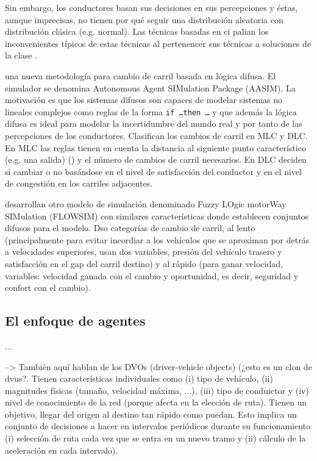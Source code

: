 Sin embargo, los conductores basan sus decisiones en sus percepciones y éstas, aunque imprecisas, no tienen por qué seguir una distribución aleatoria con distribución clásica (e.g. normal). Las técnicas basadas en \gls{ci} palian los inconvenientes típicos de estas técnicas al pertenencer sus técnicas a soluciones de la clase .

\cite{Das2009} una nueva metodología para cambio de carril basada en lógica difusa. El simulador se denomina Autonomous Agent SIMulation Package (AASIM). La motivación es que los sistemas difusos son capaces de modelar sistemas no lineales complejos como  reglas de la forma \texttt{if \ldots then \ldots} y que además la lógica difusa es ideal para modelar la incertidumbre del mundo real y por tanto de las percepciones de los conductores. Clasifican los cambios de carril en MLC y DLC. En MLC las reglas tienen en cuenta la distancia al siguiente punto característico (e.g. una salida) () y el número de cambios de carril necesarios. En DLC deciden si cambiar o no basándose en el nivel de satisfacción del conductor y en el nivel de congestión en los carriles adjacentes.

\cite{McDonald1997, Wu2003} desarrollan otro modelo de simulación denominado Fuzzy LOgic motorWay SIMulation (FLOWSIM) con similares características donde establecen conjuntos difusos para el modelo. Dso categorías de cambio de carril, al lento (principalmente para evitar incordiar a los vehículos que se aproximan por detrás a velocidades superiores, usan dos variables, presión del vehículo trasero y satisfacción en el gap del carril destino) y al rápido (para ganar velocidad, variables: velocidad ganada con el cambio y oportunidad, es decir, seguridad y confort con el cambio).



\subsection{El enfoque de agentes}

...

\cite{Hidas2002} --> También aquí hablan de los DVOs (driver-vehicle objects) (¿esto es un clon de \glspl{dvu}?. Tienen características individuales como (i) tipo de vehículo, (ii) magnitudes físicas (tamaño, velocidad máxima, ...), (iii) tipo de conduictor y (iv) nivel de conocimiento de la red (porque afecta en la elección de ruta). Tienen un objetivo, llegar del origen al destino tan rápido como puedan. Esto implica un conjunto de decisiones a hacer en intervalos periódicos durante su funcionamiento (i) selección de ruta cada vez que se entra en un nuevo tramo y (ii) cálculo de la aceleración en cada intervalo).

